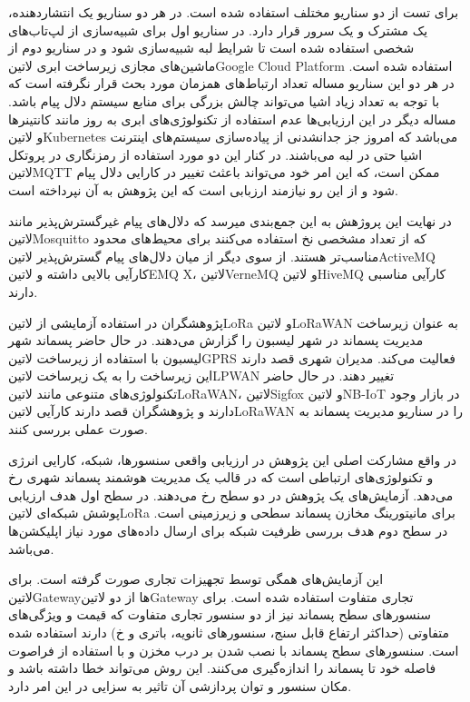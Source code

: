 برای تست از دو سناریو مختلف استفاده شده است. در هر دو سناریو یک انتشاردهنده، یک مشترک و یک سرور قرار دارد. در سناریو اول برای شبیه‌سازی از لپ‌تاب‌های شخصی استفاده شده است
تا شرایط لبه شبیه‌سازی شود و در سناریو دوم از ماشین‌های مجازی زیرساخت ابری ‌لاتین{Google Cloud Platform} استفاده شده است.
در هر دو این سناریو مساله تعداد ارتباط‌های همزمان مورد بحث قرار نگرفته است که با توجه به تعداد زیاد اشیا می‌تواند چالش بزرگی برای منابع سیستم دلال پیام باشد.
مساله دیگر در این ارزیابی‌ها عدم استفاده از تکنولوژی‌های ابری به روز مانند کانتینرها و ‌لاتین{Kubernetes} می‌باشد که امروز جز جدانشدنی از پیاده‌سازی سیستم‌های اینترنت اشیا حتی در لبه می‌باشند.
در کنار این دو مورد استفاده از رمزنگاری در پروتکل ‌لاتین{MQTT} ممکن است، که این امر خود می‌تواند باعثث تغییر در کارایی دلال پیام شود و از این رو نیازمند ارزبابی است که این پژوهش به آن نپرداخته است.

در نهایت این پروژهش به این جمع‌بندی میرسد که دلال‌های پیام غیرگسترش‌پذیر مانند ‌لاتین{Mosquitto} که از تعداد مشخصی نخ استفاده می‌کنند برای محیط‌های محدود مناسب‌تر هستند.
از سوی دیگر از میان دلال‌های پیام گسترش‌پذیر ‌لاتین{ActiveMQ} کارآیی بالایی داشته و ‌لاتین{EMQ X}، ‌لاتین{VerneMQ} و ‌لاتین{HiveMQ} کارآیی مناسبی دارند.


پژوهشگران در  استفاده آزمایشی از ‌لاتین{LoRa} و ‌لاتین{LoRaWAN} به عنوان زیرساخت مدیریت پسماند در شهر لیسبون را گزارش می‌دهند.
در حال حاضر پسماند شهر لیسبون با استفاده از زیرساخت ‌لاتین{GPRS} فعالیت می‌کند. مدیران شهری قصد دارند این زیرساخت را به یک زیرساخت ‌لاتین{LPWAN} تغییر دهند.
در حال حاضر تکنولوژی‌های متنوعی مانند ‌لاتین{LoRaWAN}، ‌لاتین{Sigfox} و ‌لاتین{NB-IoT} در بازار وجود دارند و پژوهشگران قصد دارند کارآیی ‌لاتین{LoRaWAN} را در
سناریو مدیریت پسماند به صورت عملی بررسی کنند.

در واقع مشارکت اصلی این پژوهش در ارزیابی واقعی سنسورها، شبکه، کارایی انرژی و تکنولوژی‌های ارتباطی است که در قالب یک مدیریت هوشمند پسماند شهری رخ می‌دهد.
آزمایش‌های یک پژوهش در دو سطح رخ می‌دهند. در سطح اول هدف ارزیابی پوشش شبکه‌ای ‌لاتین{LoRa} برای مانیتورینگ مخازن پسماند سطحی و زیرزمینی است.
در سطح دوم هدف بررسی ظرفیت شبکه برای ارسال داده‌های مورد نیاز اپلیکشن‌ها می‌باشد.

این آزمایش‌های همگی توسط تجهیزات تجاری صورت گرفته است. برای ‌لاتین{Gateway}ها از دو ‌لاتین{Gateway} تجاری متفاوت استفاده شده است.
برای سنسورهای سطح پسماند نیز از دو سنسور تجاری متفاوت که قیمت و ویژگی‌های متفاوتی (حداکثر ارتفاع قابل سنج، سنسورهای ثانویه، باتری و ‌خ) دارند استفاده شده است.
سنسورهای سطح پسماند با نصب شدن بر درب مخزن و با استفاده از فراصوت فاصله خود تا پسماند را اندازه‌گیری می‌کنند. این روش می‌تواند خطا داشته باشد
و مکان سنسور و توان پردازشی آن تاثیر به سزایی در این امر دارد.

